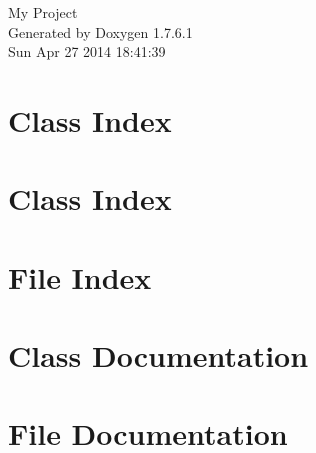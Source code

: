 \documentclass[a4paper]{book}
\begin{document}
\hypersetup{pageanchor=false,citecolor=blue}
\begin{titlepage}
\vspace*{7cm}
\begin{center}
{\Large \-My \-Project }\\
\vspace*{1cm}
{\large \-Generated by Doxygen 1.7.6.1}\\
\vspace*{0.5cm}
{\small Sun Apr 27 2014 18:41:39}\\
\end{center}
\end{titlepage}
\clearemptydoublepage
{}
\tableofcontents
\clearemptydoublepage
{}
\hypersetup{pageanchor=true,citecolor=blue}
\chapter{\-Class \-Index}

\chapter{\-Class \-Index}

\chapter{\-File \-Index}

\chapter{\-Class \-Documentation}

































\chapter{\-File \-Documentation}
















\printindex
\end{document}
